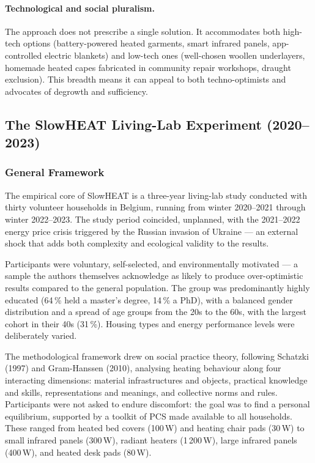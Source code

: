 \paragraph{Technological and social pluralism.}
The approach does not prescribe a single solution. It
accommodates both high-tech options (battery-powered heated
garments, smart infrared panels, app-controlled electric blankets)
and low-tech ones (well-chosen woollen underlayers, homemade
heated capes fabricated in community repair workshops, draught
exclusion). This breadth means it can appeal to both
techno-optimists and advocates of degrowth and sufficiency.

\subsection{The SlowHEAT Living-Lab Experiment (2020--2023)}

\subsubsection{General Framework}

The empirical core of SlowHEAT is a three-year living-lab study
conducted with thirty volunteer households in Belgium, running from
winter 2020--2021 through winter 2022--2023. The study period
coincided, unplanned, with the 2021--2022 energy price crisis
triggered by the Russian invasion of Ukraine --- an external shock
that adds both complexity and ecological validity to the results.

Participants were voluntary, self-selected, and environmentally
motivated --- a sample the authors themselves acknowledge as likely
to produce over-optimistic results compared to the general
population. The group was predominantly highly educated (64\,\%
held a master's degree, 14\,\% a PhD), with a balanced gender
distribution and a spread of age groups from the 20s to the 60s,
with the largest cohort in their 40s (31\,\%). Housing types and
energy performance levels were deliberately varied.

The methodological framework drew on social practice theory,
following Schatzki (1997) and Gram-Hanssen (2010), analysing
heating behaviour along four interacting dimensions: material
infrastructures and objects, practical knowledge and skills,
representations and meanings, and collective norms and rules.
Participants were not asked to endure discomfort: the goal was to
find a personal equilibrium, supported by a toolkit of PCS made
available to all households. These ranged from heated bed covers
(100\,W) and heating chair pads (30\,W) to small infrared panels
(300\,W), radiant heaters (1\,200\,W), large infrared panels
(400\,W), and heated desk pads (80\,W).


